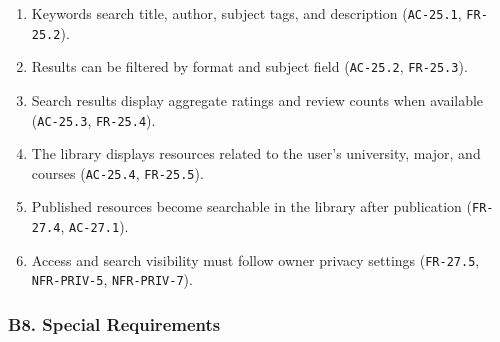 \documentclass[12pt]{article}
\begin{document}
\begin{enumerate}
\item Keywords search title, author, subject tags, and description (\texttt{AC-25.1}, \texttt{FR-25.2}).
\item Results can be filtered by format and subject field (\texttt{AC-25.2}, \texttt{FR-25.3}).
\item Search results display aggregate ratings and review counts when available (\texttt{AC-25.3}, \texttt{FR-25.4}).
\item The library displays resources related to the user's university, major, and courses (\texttt{AC-25.4}, \texttt{FR-25.5}).
\item Published resources become searchable in the library after publication (\texttt{FR-27.4}, \texttt{AC-27.1}).
\item Access and search visibility must follow owner privacy settings (\texttt{FR-27.5}, \texttt{NFR-PRIV-5}, \texttt{NFR-PRIV-7}).
\end{enumerate}
\par\medskip

\hypertarget{sec:b8-special-requirements}{}
\subsubsection*{B8. Special Requirements}
\par\medskip
\end{document}

